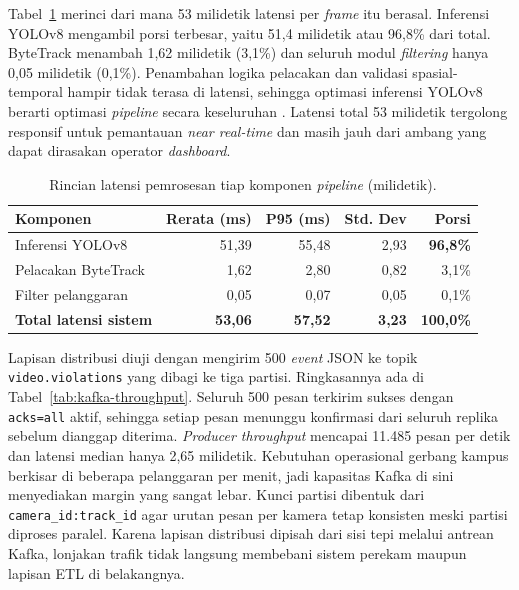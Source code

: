 Tabel~\ref{tab:latency-decomposition} merinci dari mana 53 milidetik latensi per \textit{frame} itu berasal. Inferensi YOLOv8 mengambil porsi terbesar, yaitu 51,4 milidetik atau 96,8\% dari total. ByteTrack menambah 1,62 milidetik (3,1\%) dan seluruh modul \textit{filtering} hanya 0,05 milidetik (0,1\%). Penambahan logika pelacakan dan validasi spasial-temporal hampir tidak terasa di latensi, sehingga optimasi inferensi YOLOv8 berarti optimasi \textit{pipeline} secara keseluruhan \cite{zhang2022bytetrack_eccv}. Latensi total 53 milidetik tergolong responsif untuk pemantauan \textit{near real-time} dan masih jauh dari ambang yang dapat dirasakan operator \textit{dashboard}.

\begin{table}[htbp]
\centering
\caption{Rincian latensi pemrosesan tiap komponen \textit{pipeline} (milidetik).}
\label{tab:latency-decomposition}
\small
\setlength{\tabcolsep}{4pt}
\begin{tabularx}{\textwidth}{>{\RaggedRight\arraybackslash}Xrrrr}
\toprule
\textbf{Komponen} & \textbf{Rerata (ms)} & \textbf{P95 (ms)} & \textbf{Std. Dev} & \textbf{Porsi} \\
\midrule
Inferensi YOLOv8 & 51,39 & 55,48 & 2,93 & \textbf{96,8\%} \\
Pelacakan ByteTrack & 1,62 & 2,80 & 0,82 & 3,1\% \\
Filter pelanggaran & 0,05 & 0,07 & 0,05 & 0,1\% \\
\midrule
\textbf{Total latensi sistem} & \textbf{53,06} & \textbf{57,52} & \textbf{3,23} & \textbf{100,0\%} \\
\bottomrule
\end{tabularx}
\end{table}

Lapisan distribusi diuji dengan mengirim 500 \textit{event} JSON ke topik \texttt{video.violations} yang dibagi ke tiga partisi. Ringkasannya ada di Tabel~\ref{tab:kafka-throughput}. Seluruh 500 pesan terkirim sukses dengan \texttt{acks=all} aktif, sehingga setiap pesan menunggu konfirmasi dari seluruh replika sebelum dianggap diterima. \textit{Producer throughput} mencapai 11.485 pesan per detik dan latensi median hanya 2,65 milidetik. Kebutuhan operasional gerbang kampus berkisar di beberapa pelanggaran per menit, jadi kapasitas Kafka di sini menyediakan margin yang sangat lebar. Kunci partisi dibentuk dari \texttt{camera\_id:track\_id} agar urutan pesan per kamera tetap konsisten meski partisi diproses paralel. Karena lapisan distribusi dipisah dari sisi tepi melalui antrean Kafka, lonjakan trafik tidak langsung membebani sistem perekam maupun lapisan ETL di belakangnya.

